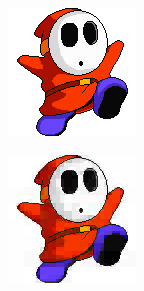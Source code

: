 \begin{figure}
  \centering
  \begin{subfigure}[b]{0.24\textwidth}
    \centering
    \includegraphics[width=\textwidth]{plaatjes/shyguy_haar_0_1.png}
  \end{subfigure}
  \begin{subfigure}[b]{0.24\textwidth}
    \centering
    \includegraphics[width=\textwidth]{plaatjes/shyguy_haar_0_05.png}

\end{subfigure}
\end{figure}
